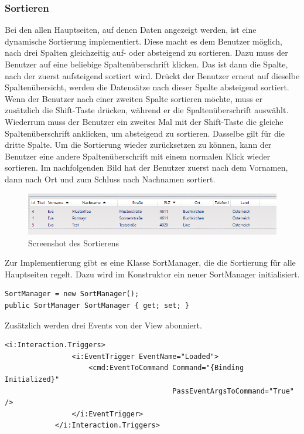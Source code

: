 \subsubsection{Sortieren}
Bei den allen Hauptseiten, auf denen Daten angezeigt werden, ist eine dynamische Sortierung implementiert. Diese macht es dem Benutzer möglich, nach drei Spalten gleichzeitig auf- oder absteigend zu sortieren.  Dazu muss der Benutzer auf eine beliebige Spaltenüberschrift klicken. Das ist dann die Spalte, nach der zuerst aufsteigend sortiert wird. Drückt der Benutzer erneut auf dieselbe Spaltenübersicht, werden die Datensätze nach dieser Spalte absteigend sortiert. Wenn der Benutzer nach einer zweiten Spalte sortieren möchte, muss er zusätzlich die Shift-Taste drücken, während er die Spaltenüberschrift auswählt. Wiederrum muss der Benutzer ein zweites Mal mit der Shift-Taste die gleiche Spaltenüberschrift anklicken, um absteigend zu sortieren. Dasselbe gilt für die dritte Spalte. Um die Sortierung wieder zurücksetzen zu können, kann der Benutzer eine andere Spaltenüberschrift mit einem normalen Klick wieder sortieren. Im nachfolgenden Bild hat der Benutzer zuerst nach dem Vornamen, dann nach Ort und zum Schluss nach Nachnamen sortiert.
\begin{figure}[H]
\begin{center}
	\includegraphics[scale=0.75]{images/Sortieren.png}
\end{center}
	\caption{Screenshot des Sortierens}
	\label{fig:sample}
\end{figure}
Zur Implementierung gibt es eine Klasse SortManager, die die Sortierung für alle Hauptseiten regelt. Dazu wird im Konstruktor ein neuer SortManager initialisiert.
\begin{lstlisting}
SortManager = new SortManager();
public SortManager SortManager { get; set; }
\end{lstlisting}
Zusätzlich werden drei Events von der View abonniert. 
\begin{lstlisting}
<i:Interaction.Triggers>
                <i:EventTrigger EventName="Loaded">
                    <cmd:EventToCommand Command="{Binding Initialized}"
                                        PassEventArgsToCommand="True" />
                </i:EventTrigger>
            </i:Interaction.Triggers>
\end{lstlisting}
